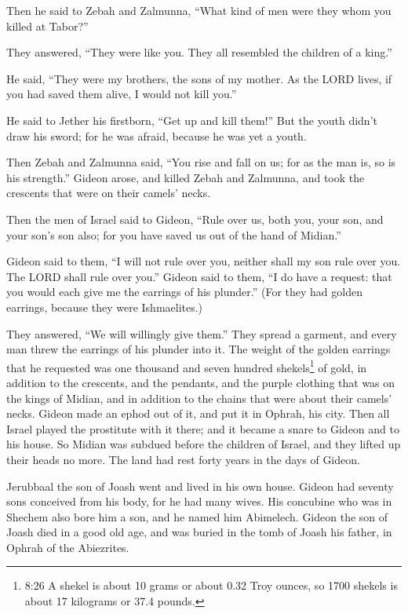 \myverse{}Then he said to Zebah and Zalmunna, “What kind of men were they
whom you killed at Tabor?”

They answered, “They were like you. They all resembled the children of a king.”

\myverse{}He said, “They were my brothers, the sons of my mother. As the
LORD lives, if you had saved them alive, I would not kill you.”

\myverse{}He said to Jether his firstborn, “Get up and kill them!” But
the youth didn’t draw his sword; for he was afraid, because he was yet a youth.

\myverse{}Then Zebah and Zalmunna said, “You rise and fall on us; for as
the man is, so is his strength.” Gideon arose, and killed Zebah and Zalmunna, and took the crescents that
were on their camels’ necks.

\myverse{}Then the men of Israel said to Gideon, “Rule over us, both you,
your son, and your son’s son also; for you have saved us out of the hand of Midian.”

\myverse{}Gideon said to them, “I will not rule over you, neither shall
my son rule over you. The LORD shall rule over you.”
\myverse{}Gideon said to them, “I do have a request: that you would each give me the
earrings of his plunder.” (For they had golden earrings, because they were Ishmaelites.)

\myverse{}They answered, “We will willingly give them.” They spread a garment,
and every man threw the earrings of his plunder into it.
\myverse{}The weight of the golden earrings that he requested was one thousand and seven
hundred shekels\footnote{8:26 A shekel is about 10 grams or about 0.32 Troy ounces, so 1700 shekels is about 17 kilograms or
	37.4 pounds.} of gold, in addition to the crescents, and the pendants, and the purple clothing
that was on the kings of Midian, and in addition to the chains that were about their camels’ necks.
\myverse{}Gideon made an ephod out of it, and put it in Ophrah, his city. Then all Israel
played the prostitute with it there; and it became a snare to Gideon and to his house.
\myverse{}So Midian was subdued before the children of Israel, and they lifted up their
heads no more. The land had rest forty years in the days of Gideon.

\myverse{}Jerubbaal the son of Joash went and lived in his own house.
\myverse{}Gideon had seventy sons conceived from his body, for he had many wives.
\myverse{}His concubine who was in Shechem also bore him a son, and he named him Abimelech.
\myverse{}Gideon the son of Joash died in a good old age, and was buried in the tomb
of Joash his father, in Ophrah of the Abiezrites.

